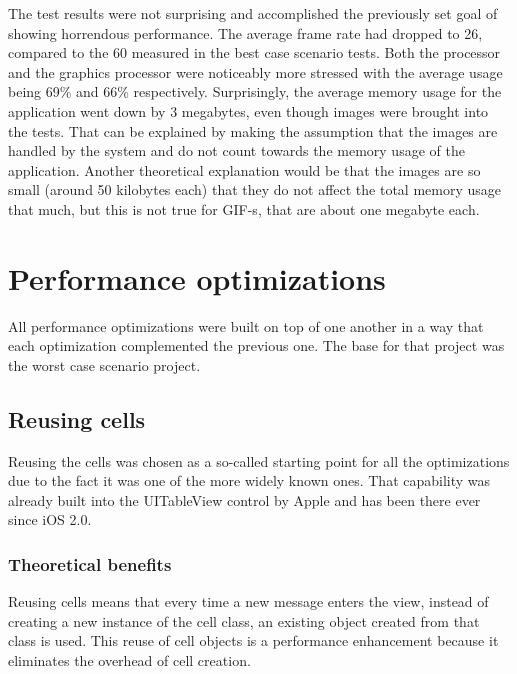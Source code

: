 \documentclass[a4paper,12pt]{article}
\begin{document}
The test results were not surprising and accomplished the previously set goal of showing horrendous performance. The average frame rate had dropped to 26, compared to the 60 measured in the best case scenario tests. Both the processor and the graphics processor were noticeably more stressed with the average usage being 69\% and 66\% respectively. Surprisingly, the average memory usage for the application went down by 3 megabytes, even though images were brought into the tests. That can be explained by making the assumption that the images are handled by the system and do not count towards the memory usage of the application. Another theoretical explanation would be that the images are so small (around 50 kilobytes each) that they do not affect the total memory usage that much, but this is not true for GIF-s, that are about one megabyte each.

\section{Performance optimizations}
All performance optimizations were built on top of one another in a way that each optimization complemented the previous one. The base for that project was the worst case scenario project. 

\subsection{Reusing cells}
Reusing the cells was chosen as a so-called starting point for all the optimizations due to the fact it was one of the more widely known ones. That capability was already built into the UITableView control by Apple and has been there ever since iOS 2.0.\cite{HackingWithSwiftCellReuse}

\subsubsection{Theoretical benefits}
Reusing cells means that every time a new message enters the view, instead of creating a new instance of the cell class, an existing object created from that class is used. This reuse of cell objects is a performance enhancement because it eliminates the overhead of cell creation.\cite{AppleCharacteristicsOfCellObjects}
\end{document}
